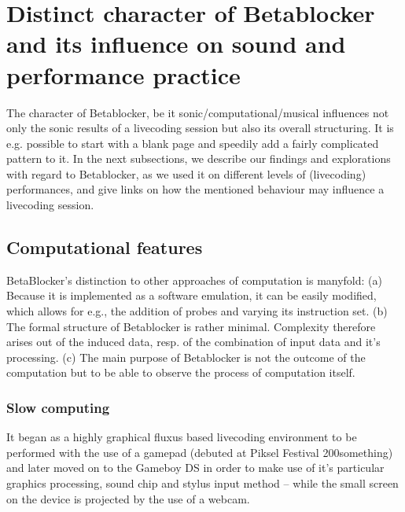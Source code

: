 \documentclass[letterpaper, 12pt]{article}
\begin{document}
\section{Distinct character of Betablocker and its influence on sound and performance practice} 
\label{sec:distinct_character}


The character of Betablocker, be it sonic/computational/musical influences not only the sonic results of a livecoding session but also its overall structuring. 
It is e.g. possible to start with a blank page and speedily add a fairly complicated pattern to it.
In the next subsections, we describe our findings and explorations with regard to Betablocker, as we used it on different levels of (livecoding) performances, and give links on how the mentioned behaviour may influence a livecoding session.

\subsection{Computational features} 
\label{sub:computational_features}

BetaBlocker's distinction to other approaches of computation is manyfold:
(a) Because it is implemented as a software emulation, it can be easily modified, which allows for e.g., the addition of probes and varying its instruction set.
(b) The formal structure of Betablocker is rather minimal. Complexity therefore arises out of the induced data, resp. of the combination of input data and it's processing.
(c) The main purpose of Betablocker is not the outcome of the computation but to be able to observe the process of computation itself. 



\subsubsection{Slow computing} 
\label{sub:slow_computing}
It began as a highly graphical fluxus based livecoding environment to be performed with the use of a gamepad (debuted at Piksel Festival 200something) and later moved on to the Gameboy DS in order to make use of it's particular graphics processing, sound chip and stylus input method -- while the small screen on the device is projected by the use of a webcam.

\end{document}
